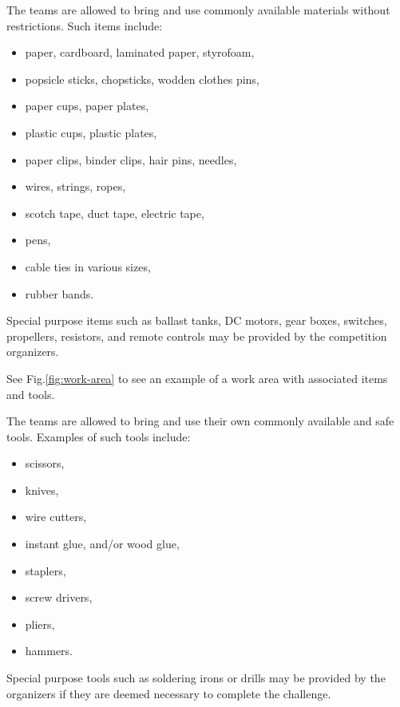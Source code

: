 \documentclass[12pt]{hurocup}
\begin{document}
\begin{decisions}

\item \label{dec-items} The teams are allowed to bring and use
  commonly available materials without restrictions. Such items
  include:
  \begin{itemize}
    \item paper, cardboard, laminated paper, styrofoam, 
    \item popsicle sticks, chopsticks, wodden clothes pins,
    \item paper cups, paper plates,
    \item plastic cups, plastic plates,
    \item paper clips, binder clips, hair pins, needles,
    \item wires, strings, ropes, 
    \item scotch tape, duct tape, electric tape,
    \item pens,
    \item cable ties in various sizes,
    \item rubber bands.
  \end{itemize}

  Special purpose items such as ballast tanks, DC motors, gear boxes,
  switches, propellers, resistors, and remote controls may be provided
  by the competition organizers.
      
  See Fig.\ref{fig:work-area} to see an example of a work area with
  associated items and tools.

\item \label{dec-tools} The teams are allowed to bring and use their
  own commonly available and safe tools. Examples of such tools include:
  \begin{itemize}
    \item scissors,
    \item knives, 
    \item wire cutters,
    \item instant glue, and/or wood glue, 
    \item staplers,
    \item screw drivers,
    \item pliers,
    \item hammers.
  \end{itemize}
  
  Special purpose tools such as soldering irons or drills may be
  provided by the organizers if they are deemed necessary to complete
  the challenge.


\end{decisions}
\end{document}
